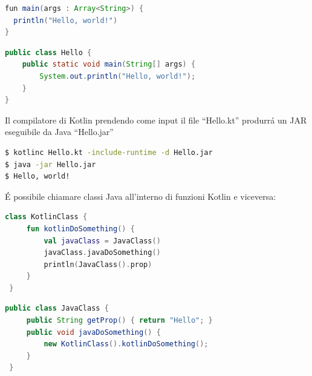 \begin{lstlisting}[language=java,caption={Hello World in Kotlin}]
fun main(args : Array<String>) {
  println("Hello, world!")
}
\end{lstlisting}

\begin{lstlisting}[language=java,caption={Hello World in Java}]
public class Hello {
    public static void main(String[] args) {
        System.out.println("Hello, world!");
    }
}
\end{lstlisting}

Il compilatore di Kotlin prendendo come input il file ``Hello.kt'' produrr\'a un JAR eseguibile da Java ``Hello.jar''

\begin{lstlisting}[language=bash,caption={Compilazione di un programma Kotlin}]
$ kotlinc Hello.kt -include-runtime -d Hello.jar
$ java -jar Hello.jar
$ Hello, world!
\end{lstlisting}

\'E possibile chiamare classi Java all'interno di funzioni Kotlin e viceversa:


\begin{lstlisting}[language=Kotlin,caption={Chiamare Java da Kotlin}]
 class KotlinClass {
     fun kotlinDoSomething() {
         val javaClass = JavaClass()
         javaClass.javaDoSomething()
         println(JavaClass().prop)
     }
 }
 \end{lstlisting}

 \begin{lstlisting}[language=java,caption={Chiamare Kotlin da Java}]
 public class JavaClass {
     public String getProp() { return "Hello"; }
     public void javaDoSomething() {
         new KotlinClass().kotlinDoSomething();
     }
 }
 \end{lstlisting}

